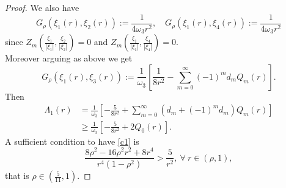 \documentclass[10pt,a4paper]{amsart}
\begin{document}
\begin{proof}
We also have
$$G_\rho(\xi_1(r), \xi_2(r)):=\frac{1}{4\omega_3 r^2},\quad G_\rho(\xi_1(r), \xi_4(r)):=\frac{1}{4\omega_3 r^2}$$
since $Z_m\left(\frac{\xi_1}{|\xi_1|},\frac{\xi_2}{|\xi_2|}\right)=0$ and $Z_m\left(\frac{\xi_1}{|\xi_1|},\frac{\xi_4}{|\xi_4|}\right)=0$.\\
Moreover arguing as above we get
$$G_\rho(\xi_1(r), \xi_3(r)):=\frac{1}{\omega_3}\left[\frac{1}{8r^2}-\sum_{m=0}^\infty (-1)^m d_m Q_m(r)\right].$$ 
Then
\begin{equation*}
\begin{aligned}
\Lambda_1(r) & = \frac{1}{\omega_3} \left[ -\frac{5}{8r^{2}} + \sum_{m=0}^{\infty} (d_m+ (-1)^{m} d_m) Q_{m}(r) \right]
\\& \geq \frac{1}{\omega_3} \left[ - \frac{5}{8r^{2}} + 2Q_{0}(r) \right].\end{aligned}
\end{equation*}
A sufficient condition to have \eqref{c1} is 
\begin{equation*}
\frac{8\rho^2 -16\rho^2r^2+8r^4}{r^{4}(1-\rho^2)} > \frac{5}{r^2}, \ \forall\ r \in (\rho,1),
\end{equation*}
that is $\rho \in (\frac{5}{11}, 1)$.
\end{proof}
\end{document}
